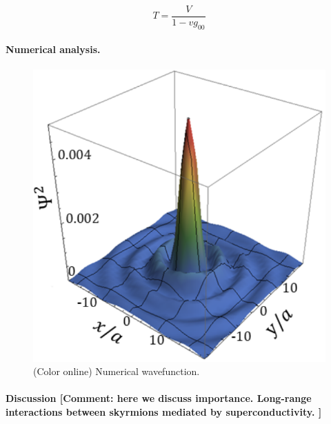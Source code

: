 \documentclass[twocolumn,showpacs,floatfix,nofootinbib,longbibliography]{revtex4-1}
\begin{document}
\begin{equation}
 T = \frac{V}{1-vg_{00}}
\end{equation}

\paragraph*{Numerical analysis.} \label{sec:numerics} 

\begin{figure} \centering
\includegraphics[width=0.8\linewidth]{WaveFunction}  
\caption{(Color online) Numerical wavefunction. } \label{fig:wavefunction}
\end{figure}

\paragraph*{Discussion [Comment: here we discuss importance. Long-range interactions between skyrmions mediated by superconductivity. ] } \label{sec:discussion} 



\end{document}
